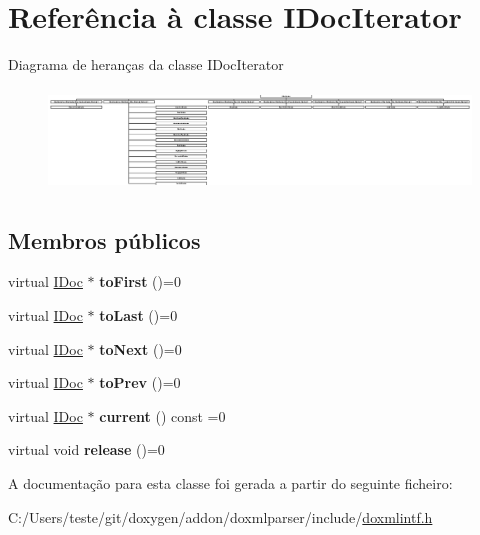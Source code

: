 \hypertarget{class_i_doc_iterator}{\section{Referência à classe I\-Doc\-Iterator}
\label{class_i_doc_iterator}
}
Diagrama de heranças da classe I\-Doc\-Iterator\begin{figure}[H]
\begin{center}
\leavevmode
\includegraphics[height=2.723112cm]{class_i_doc_iterator}
\end{center}
\end{figure}
\subsection*{Membros públicos}
\begin{DoxyCompactItemize}
\item 
\hypertarget{class_i_doc_iterator_a50e965afb8abd6b7b1dd4784f2888982}{virtual \hyperlink{class_i_doc}{I\-Doc} $\ast$ {\bfseries to\-First} ()=0}\label{class_i_doc_iterator_a50e965afb8abd6b7b1dd4784f2888982}

\item 
\hypertarget{class_i_doc_iterator_a5795c1ab523817e879d72191f3366e4b}{virtual \hyperlink{class_i_doc}{I\-Doc} $\ast$ {\bfseries to\-Last} ()=0}\label{class_i_doc_iterator_a5795c1ab523817e879d72191f3366e4b}

\item 
\hypertarget{class_i_doc_iterator_af97f6699dfe2ae191498c8dc5f646f2b}{virtual \hyperlink{class_i_doc}{I\-Doc} $\ast$ {\bfseries to\-Next} ()=0}\label{class_i_doc_iterator_af97f6699dfe2ae191498c8dc5f646f2b}

\item 
\hypertarget{class_i_doc_iterator_ac17595a4f94d9cff78079ac23818b89a}{virtual \hyperlink{class_i_doc}{I\-Doc} $\ast$ {\bfseries to\-Prev} ()=0}\label{class_i_doc_iterator_ac17595a4f94d9cff78079ac23818b89a}

\item 
\hypertarget{class_i_doc_iterator_ab18bd217b2f89d03c1e21adc26bc7a4d}{virtual \hyperlink{class_i_doc}{I\-Doc} $\ast$ {\bfseries current} () const =0}\label{class_i_doc_iterator_ab18bd217b2f89d03c1e21adc26bc7a4d}

\item 
\hypertarget{class_i_doc_iterator_aab0a52fdd148a54108e7bf49287d7c47}{virtual void {\bfseries release} ()=0}\label{class_i_doc_iterator_aab0a52fdd148a54108e7bf49287d7c47}

\end{DoxyCompactItemize}


A documentação para esta classe foi gerada a partir do seguinte ficheiro\-:\begin{DoxyCompactItemize}
\item 
C\-:/\-Users/teste/git/doxygen/addon/doxmlparser/include/\hyperlink{include_2doxmlintf_8h}{doxmlintf.\-h}\end{DoxyCompactItemize}
